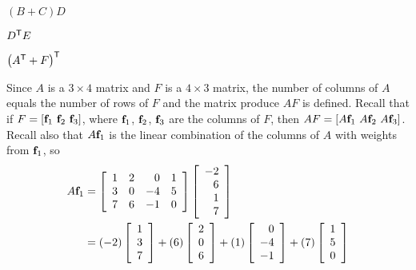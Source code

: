 \begin{example}
	\begin{minipage}{1.5in}
	\item $(B+C)D$
	\end{minipage}
	\begin{minipage}{1.5in}
	\item $D^{\mathsf{T}}E$
	\end{minipage}
	\begin{minipage}{1.5in}
	\item $\left(A^{\mathsf{T}}+F\right)^{\mathsf{T}}$
	\end{minipage}
	\ea

\ExampleSolution
\ba
\item Since $A$ is a $3 \times 4$ matrix and $F$ is a $4 \times 3$ matrix, the number of columns of $A$ equals the number of rows of $F$ and the matrix produce $AF$ is defined. Recall that if $F = [\mathbf{f}_1 \ \mathbf{f}_2 \ \mathbf{f}_3]$, where $\mathbf{f}_1$, $\mathbf{f}_2$, $\mathbf{f}_3$ are the columns of $F$, then $AF = [A\mathbf{f}_1 \ A\mathbf{f}_2 \ A\mathbf{f}_3]$. Recall also that $A \mathbf{f}_1$ is the linear combination of the columns of $A$ with weights from $\mathbf{f}_1$, so 
\begin{align*}
A\vf_1 &= \left[ \begin{array}{ccrc} 1&2&0&1\\3&0&-4&5\\7&6&-1&0 \end{array} \right] \left[ \begin{array}{r} -2\\6\\1\\7 \end{array} \right] \\
	&= (-2) \left[ \begin{array}{c} 1\\3\\7 \end{array} \right]  + (6)  \left[ \begin{array}{c} 2\\0\\6 \end{array} \right]  + (1)  \left[ \begin{array}{r} 0\\-4\\-1 \end{array} \right] + (7)  \left[ \begin{array}{c} 1\\5\\0 \end{array} \right] \\

\end{align*}
\end{example}
